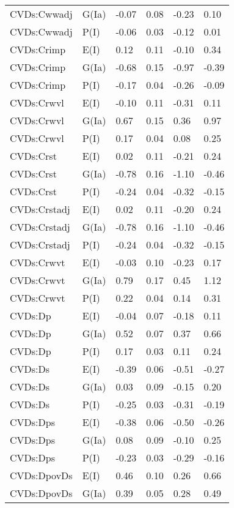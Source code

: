\begin{center}
\begin{longtable}{|p{1.1in}|p{0.7in}|p{0.7in}|p{0.6in}|p{0.6in}|p{0.6in}|}
  CVDs:Cwwadj & G(Ia) & -0.07 & 0.08 & -0.23 & 0.10 \\ 
  CVDs:Cwwadj & P(I) & -0.06 & 0.03 & -0.12 & 0.01 \\ 
  CVDs:Crimp & E(I) & 0.12 & 0.11 & -0.10 & 0.34 \\ 
  CVDs:Crimp & G(Ia) & -0.68 & 0.15 & -0.97 & -0.39 \\ 
  CVDs:Crimp & P(I) & -0.17 & 0.04 & -0.26 & -0.09 \\ 
  CVDs:Crwvl & E(I) & -0.10 & 0.11 & -0.31 & 0.11 \\ 
  CVDs:Crwvl & G(Ia) & 0.67 & 0.15 & 0.36 & 0.97 \\ 
  CVDs:Crwvl & P(I) & 0.17 & 0.04 & 0.08 & 0.25 \\ 
  CVDs:Crst & E(I) & 0.02 & 0.11 & -0.21 & 0.24 \\ 
  CVDs:Crst & G(Ia) & -0.78 & 0.16 & -1.10 & -0.46 \\ 
  CVDs:Crst & P(I) & -0.24 & 0.04 & -0.32 & -0.15 \\ 
  CVDs:Crstadj & E(I) & 0.02 & 0.11 & -0.20 & 0.24 \\ 
  CVDs:Crstadj & G(Ia) & -0.78 & 0.16 & -1.10 & -0.46 \\ 
  CVDs:Crstadj & P(I) & -0.24 & 0.04 & -0.32 & -0.15 \\ 
  CVDs:Crwvt & E(I) & -0.03 & 0.10 & -0.23 & 0.17 \\ 
  CVDs:Crwvt & G(Ia) & 0.79 & 0.17 & 0.45 & 1.12 \\ 
  CVDs:Crwvt & P(I) & 0.22 & 0.04 & 0.14 & 0.31 \\ 
  CVDs:Dp & E(I) & -0.04 & 0.07 & -0.18 & 0.11 \\ 
  CVDs:Dp & G(Ia) & 0.52 & 0.07 & 0.37 & 0.66 \\ 
  CVDs:Dp & P(I) & 0.17 & 0.03 & 0.11 & 0.24 \\ 
  CVDs:Ds & E(I) & -0.39 & 0.06 & -0.51 & -0.27 \\ 
  CVDs:Ds & G(Ia) & 0.03 & 0.09 & -0.15 & 0.20 \\ 
  CVDs:Ds & P(I) & -0.25 & 0.03 & -0.31 & -0.19 \\ 
  CVDs:Dps & E(I) & -0.38 & 0.06 & -0.50 & -0.26 \\ 
  CVDs:Dps & G(Ia) & 0.08 & 0.09 & -0.10 & 0.25 \\ 
  CVDs:Dps & P(I) & -0.23 & 0.03 & -0.29 & -0.16 \\ 
  CVDs:DpovDs & E(I) & 0.46 & 0.10 & 0.26 & 0.66 \\ 
  CVDs:DpovDs & G(Ia) & 0.39 & 0.05 & 0.28 & 0.49 \\ 

\end{longtable}
\end{center}
